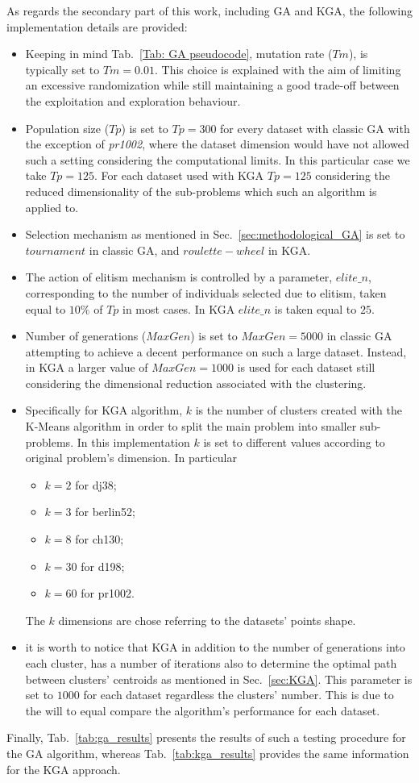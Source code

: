 \documentclass[10pt]{article}
\begin{document}
As regards the secondary part of this work, including GA and KGA, the following implementation details are provided:
\begin{itemize}
\item Keeping in mind Tab.~\ref{Tab: GA pseudocode}, mutation rate ($Tm$), is typically set to $Tm = 0.01$. 
This choice is explained with the aim of limiting an excessive randomization while still maintaining a good trade-off between the exploitation and exploration behaviour.
\item Population size ($Tp$) is set to $Tp = 300$ for every dataset with classic GA with the exception of \textit{pr1002}, where the dataset dimension would have not allowed such a setting considering the computational limits. 
In this particular case we take $Tp = 125$. 
For each dataset used with KGA $Tp = 125$ considering the reduced dimensionality of the sub-problems which such an algorithm is applied to.
\item Selection mechanism as mentioned in Sec.~\ref{sec:methodological_GA} is set to $tournament$ in classic GA, and $roulette-wheel$ in KGA.
\item The action of elitism mechanism is controlled by a parameter, $elite\_n$,  corresponding to the number of individuals selected due to elitism, taken equal to $10\%$ of $Tp$ in most cases. In KGA $elite\_n$ is taken equal to $25$.
\item Number of generations ($MaxGen$) is set to $MaxGen = 5000$ in classic GA attempting to achieve a decent performance on such a large dataset.
Instead, in KGA a larger value of $MaxGen = 1000$ is used for each dataset still considering the dimensional reduction associated with the clustering.
\item Specifically for KGA algorithm, $k$ is the number of clusters created with the K-Means algorithm in order to split the main problem into smaller sub-problems. In this implementation $k$ is set to different values according to original problem's dimension.
In particular
\begin{itemize}
\item $k = 2$ for dj38;
\item $k = 3$ for berlin52;
\item $k = 8$ for ch130;
\item $k = 30$ for d198;
\item $k = 60$ for pr1002.
\end{itemize}
The $k$ dimensions are chose referring to the datasets' points shape.
\item it is worth to notice that KGA in addition to the number of generations into each cluster, has a number of iterations also to determine the optimal path between clusters' centroids as mentioned in Sec.~\ref{sec:KGA}. This parameter is set to $1000$ for each dataset regardless the clusters' number. This is due to the will to equal compare the algorithm's performance for each dataset.
\end{itemize}
Finally, Tab.~\ref{tab:ga_results} presents the results of such a testing procedure for the GA algorithm, whereas Tab.~\ref{tab:kga_results} provides the same information for the KGA approach.
\end{document}
